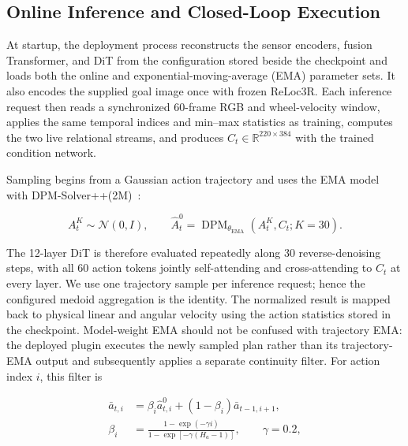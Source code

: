 \documentclass[letterpaper, 10 pt, conference]{IEEEtran}  %
\begin{document}
\subsection{Online Inference and Closed-Loop Execution}
\label{subsec:closed_loop}

At startup, the deployment process reconstructs the sensor encoders, fusion Transformer, and DiT from the configuration stored beside the checkpoint and loads both the online and exponential-moving-average (EMA) parameter sets. It also encodes the supplied goal image once with frozen ReLoc3R. Each inference request then reads a synchronized 60-frame RGB and wheel-velocity window, applies the same temporal indices and min--max statistics as training, computes the two live relational streams, and produces $C_t\in\mathbb{R}^{220\times384}$ with the trained condition network.

Sampling begins from a Gaussian action trajectory and uses the EMA model with DPM-Solver++(2M)~\cite{lu2022dpmsolverpp}:

\begin{equation}
    A_t^{K}\sim\mathcal{N}(0,I),\qquad
    \widehat{A}_t^{0}
    =\operatorname{DPM}_{\theta_{\mathrm{EMA}}}
    \!\left(A_t^{K},C_t;K=30\right).
\end{equation}

The 12-layer DiT is therefore evaluated repeatedly along 30 reverse-denoising steps, with all 60 action tokens jointly self-attending and cross-attending to $C_t$ at every layer. We use one trajectory sample per inference request; hence the configured medoid aggregation is the identity. The normalized result is mapped back to physical linear and angular velocity using the action statistics stored in the checkpoint. Model-weight EMA should not be confused with trajectory EMA: the deployed plugin executes the newly sampled plan rather than its trajectory-EMA output and subsequently applies a separate continuity filter. For action index $i$, this filter is

\begin{equation}
\begin{aligned}
\bar{a}_{t,i}
  &=\beta_i\widehat{a}_{t,i}^{0}
    +(1-\beta_i)\bar{a}_{t-1,i+1},\\
\beta_i
  &=\frac{1-\exp(-\gamma i)}
          {1-\exp[-\gamma(H_a-1)]},\qquad \gamma=0.2,
\end{aligned}
\end{equation}
\end{document}
